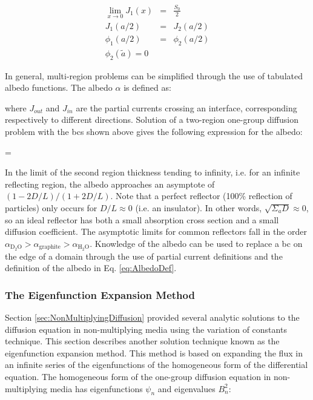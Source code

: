 \begin{subequations}
\begin{eqnarray}
\lim_{x\rightarrow0}J_1(x)&=&\frac{S_0}{2}\\
J_1(a/2)&=&J_2(a/2)\\
\phi_1(a/2)&=&\phi_2(a/2)\\
\phi_2(\tilde{a})=0
\end{eqnarray}
\end{subequations}

In general, multi-region problems can be simplified through the use of tabulated albedo functions. The albedo \(\alpha\) is defined as:

\beq
\label{eq:AlbedoDef}
\alpha\equiv{}
\eeq

where \(J_{out}\) and \(J_{in}\) are the partial currents crossing an interface, corresponding respectively to different directions. Solution of a two-region one-group diffusion problem with the \glspl{bc} shown above gives the following expression for the albedo:

\beq
\alpha=
\eeq

In the limit of the second region thickness tending to infinity, i.e. for an infinite reflecting region, the albedo approaches an asymptote of \((1-2D/L)/(1+2D/L)\). Note that a perfect reflector (100\% reflection of particles) only occurs for \(D/L\approx0\) (i.e. an insulator). In other words, \(\sqrt{\Sigma_aD}\approx0\), so an ideal reflector has both a small absorption cross section and a small diffusion coefficient. The asymptotic limits for common reflectors fall in the order \(\alpha_\text{D$_2$O}>\alpha_\text{graphite}>\alpha_\text{H$_2$O}\). Knowledge of the albedo can be used to replace a \gls{bc} on the edge of a domain through the use of partial current definitions and the definition of the albedo in Eq. \eqref{eq:AlbedoDef}.

\subsubsection{The Eigenfunction Expansion Method}

Section \ref{sec:NonMultiplyingDiffusion} provided several analytic solutions to the diffusion equation in non-multiplying media using the variation of constants technique. This section describes another solution technique known as the eigenfunction expansion method. This method is based on expanding the flux in an infinite series of the eigenfunctions of the homogeneous form of the differential equation. The homogeneous form of the one-group diffusion equation in non-multiplying media has eigenfunctions \(\psi_n\) and eigenvalues \(B_n^2\):

